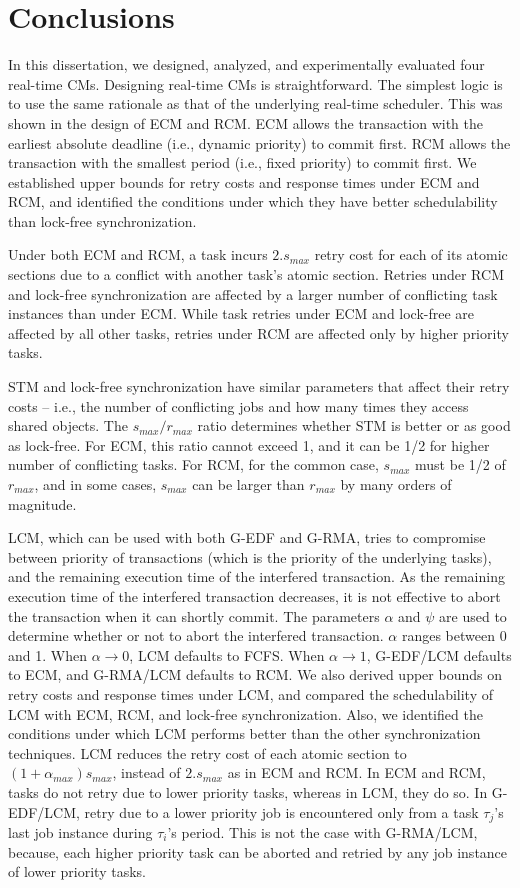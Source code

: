 \documentclass[12pt,english]{report}
\begin{document}
\section{Conclusions}

In this dissertation, we designed, analyzed, and experimentally evaluated four real-time CMs. Designing real-time CMs is straightforward. The simplest logic is to use the same rationale as that of the underlying real-time scheduler. This was shown in the design of ECM and RCM. ECM allows the transaction with the earliest absolute deadline (i.e., dynamic priority) to commit first. RCM allows the transaction with the smallest period (i.e., fixed priority) to commit first. We established upper bounds for retry costs and response times under ECM and RCM, and identified the conditions under which they have better schedulability than lock-free synchronization. 

Under both ECM and RCM, a task incurs $2.s_{max}$ retry cost for each of its atomic sections due to a conflict with another task's atomic section. Retries under RCM and lock-free synchronization are affected by a larger number of conflicting task instances than under ECM. While task retries under ECM and lock-free are affected by all other tasks, retries under RCM are affected only by higher priority tasks. 

STM and lock-free synchronization have similar parameters that affect their retry costs -- i.e., the number of conflicting jobs and how many times they access shared objects. The $s_{max}/r_{max}$ ratio determines whether STM is better or as good as lock-free. For ECM, this ratio cannot exceed 1, and it can be 1/2 for higher number of conflicting tasks. For RCM, for the common case, $s_{max}$ must be 1/2 of $r_{max}$, and in some cases, $s_{max}$ can be larger than $r_{max}$ by many orders of magnitude.

LCM, which can be used with both G-EDF and G-RMA, tries to compromise between priority of transactions (which is the priority of the underlying tasks), and the remaining execution time of the interfered transaction. As the remaining execution time of the interfered transaction decreases, it is not effective to abort the transaction when it can shortly commit. The parameters $\alpha$ and $\psi$ are used to determine whether or not to abort the interfered transaction. $\alpha$ ranges between 0 and 1. When $\alpha \rightarrow 0$, LCM defaults to FCFS. When $\alpha\rightarrow1$, G-EDF/LCM defaults to ECM, and G-RMA/LCM defaults to RCM. We also derived upper bounds on retry costs and response times under LCM, and compared the schedulability of LCM with ECM, RCM, and lock-free synchronization. Also, we identified the conditions under which LCM performs better than the other synchronization techniques. LCM reduces the retry cost  of each atomic section to $(1+\alpha_{max})s_{max}$, instead of $2.s_{max}$ as in ECM and RCM. In ECM and RCM, tasks do not retry due to lower priority tasks, whereas in LCM, they do so. In G-EDF/LCM, retry due to a lower priority job is encountered only from a task $\tau_{j}$'s last job instance during $\tau_{i}$'s period. This is not the case with G-RMA/LCM, because,  each higher priority task can be aborted and retried by any job instance of lower priority tasks. 
\end{document}
